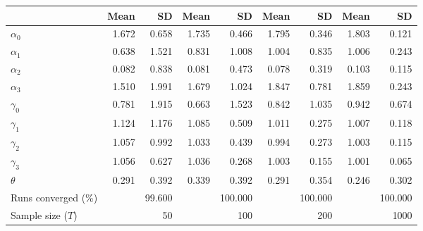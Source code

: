 
\begin{tabular}[t]{lrrrrrrrr}
\toprule
  & Mean & SD & Mean  & SD  & Mean   & SD   & Mean    & SD   \\
\midrule
$\alpha_{0}$ & 1.672 & 0.658 & 1.735 & 0.466 & 1.795 & 0.346 & 1.803 & 0.121\\
$\alpha_{1}$ & 0.638 & 1.521 & 0.831 & 1.008 & 1.004 & 0.835 & 1.006 & 0.243\\
$\alpha_{2}$ & 0.082 & 0.838 & 0.081 & 0.473 & 0.078 & 0.319 & 0.103 & 0.115\\
$\alpha_{3}$ & 1.510 & 1.991 & 1.679 & 1.024 & 1.847 & 0.781 & 1.859 & 0.243\\
$\gamma_{0}$ & 0.781 & 1.915 & 0.663 & 1.523 & 0.842 & 1.035 & 0.942 & 0.674\\
$\gamma_{1}$ & 1.124 & 1.176 & 1.085 & 0.509 & 1.011 & 0.275 & 1.007 & 0.118\\
$\gamma_{2}$ & 1.057 & 0.992 & 1.033 & 0.439 & 0.994 & 0.273 & 1.003 & 0.115\\
$\gamma_{3}$ & 1.056 & 0.627 & 1.036 & 0.268 & 1.003 & 0.155 & 1.001 & 0.065\\
$\theta$ & 0.291 & 0.392 & 0.339 & 0.392 & 0.291 & 0.354 & 0.246 & 0.302\\
Runs converged (\%) &  & 99.600 &  & 100.000 &  & 100.000 &  & 100.000\\
Sample size ($T$) &  & 50 &  & 100 &  & 200 &  & 1000\\
\bottomrule
\end{tabular}
